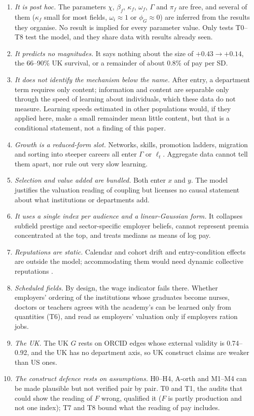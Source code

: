 \documentclass[11pt]{article}
\begin{document}
\begin{enumerate}
\item \emph{It is post hoc.} The parameters $\chi$, $\beta_f$, $\kappa_f$, $\omega_f$, $\Gamma$ and $\pi_f$ are free,
and several of them ($\kappa_f$ small for most fields, $\omega_i\approx1$ or $\phi_G\approx0$) are inferred from the
results they organise. No result is implied for every parameter value. Only tests T0--T8 test the model, and they
share data with results already seen.
\item \emph{It predicts no magnitudes.} It says nothing about the size of $+0.43\to+0.14$, the 66--90\% UK
survival, or a remainder of about 0.8\% of pay per SD.
\item \emph{It does not identify the mechanism below the name.} After entry, a department term requires only
content; information and content are separable only through the speed of learning about individuals, which these
data do not measure. Learning speeds estimated in other populations would, if they applied here, make a small
remainder mean little content, but that is a conditional statement, not a finding of this paper.
\item \emph{Growth is a reduced-form slot.} Networks, skills, promotion ladders, migration and sorting into steeper
careers all enter $\Gamma$ or $\ell_t$. Aggregate data cannot tell them apart, nor rule out very slow learning.
\item \emph{Selection and value added are bundled.} Both enter $x$ and $y$. The model justifies the valuation
reading of coupling but licenses no causal statement about what institutions or departments add.
\item \emph{It uses a single index per audience and a linear-Gaussian form.} It collapses subfield prestige and
sector-specific employer beliefs, cannot represent premia concentrated at the top, and treats medians as means of
log pay.
\item \emph{Reputations are static.} Calendar and cohort drift and entry-condition effects are outside the model;
accommodating them would need dynamic collective reputations \citep{tirole1996theory}.
\item \emph{Scheduled fields.} By design, the wage indicator fails there. Whether employers' ordering of the
institutions whose graduates become nurses, doctors or teachers agrees with the academy's can be learned only from
quantities (T6), and read as employers' valuation only if employers ration jobs.
\item \emph{The UK.} The UK $G$ rests on ORCID edges whose external validity is 0.74--0.92, and the UK has no
department axis, so UK construct claims are weaker than US ones.
\item \emph{The construct defence rests on assumptions.} H0--H4, A-orth and M1--M4 can be made plausible but not
verified pair by pair. T0 and T1, the audits that could show the reading of $F$ wrong, qualified it ($F$ is partly production and not one
index); T7 and T8 bound what the reading of pay includes.
\end{enumerate}

\clearpage
\setlength{\bibsep}{1pt plus 0.3ex}


\end{document}
